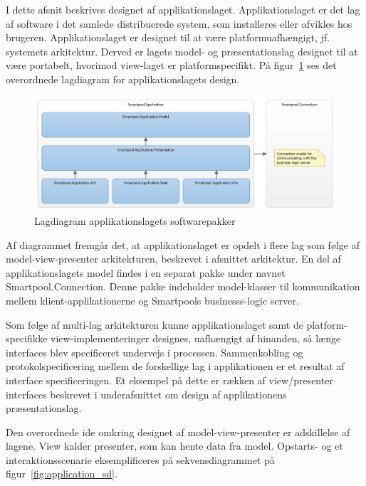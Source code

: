 I dette afsnit beskrives designet af applikationslaget. Applikationslaget er det lag af software i det samlede distribuerede system, som installeres eller afvikles hos brugeren. Applikationslaget er designet til at være platformuafhængigt, jf. systemets arkitektur. Derved er lagets model- og præsentationslag designet til at være portabelt, hvorimod view-laget er platformspecifikt. På figur~\ref{fig:application_layer} ses det overordnede lagdiagram for applikationslagets design.

\begin{figure}
	\centering
	\includegraphics[width=1.0\linewidth]{figs/design/application_layer}
	\caption{Lagdiagram applikationslagets softwarepakker}
	\label{fig:application_layer}
\end{figure}

Af diagrammet fremgår det, at applikationslaget er opdelt i flere lag som følge af model-view-presenter arkitekturen, beskrevet i afsnittet arkitektur. En del af applikationslagets model findes i en separat pakke under navnet Smartpool.Connection. Denne pakke indeholder model-klasser til kommunikation mellem klient-applikationerne og Smartpools businesss-logic server.

Som følge af multi-lag arkitekturen kunne applikationslaget samt de platform-specifikke view-implementeringer designes, uafhængigt af hinanden, så længe interfaces blev specificeret undervejs i processen. Sammenkobling og protokolspecificering mellem de forskellige lag i applikationen er et resultat af interface specificeringen. Et eksempel på dette er rækken af view/presenter interfaces beskrevet i underafsnittet om design af applikationens præsentationslag.

Den overordnede ide omkring designet af model-view-presenter er adskillelse af lagene. View kalder presenter, som kan hente data fra model. Opstarts- og et interaktionsscenarie eksemplificeres på sekvensdiagrammet på figur~\ref{fig:application_sd}.

